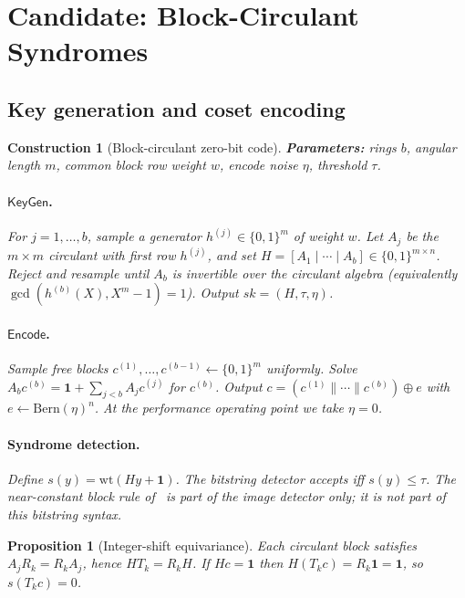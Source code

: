 \documentclass[11pt,a4paper]{article}
\newtheorem{proposition}[theorem]{Proposition}
\newtheorem{construction}[theorem]{Construction}
\newcommand{\Enc}{\mathsf{Encode}}
\newcommand{\KeyGen}{\mathsf{KeyGen}}
\newcommand{\wt}{\mathrm{wt}}
\newcommand{\Bern}{\mathrm{Bern}}
\newcommand{\sk}{\mathit{sk}}
\begin{document}
\section{Candidate: Block-Circulant Syndromes}
\label{sec:method}

\subsection{Key generation and coset encoding}
\label{sec:code}

\begin{construction}[Block-circulant zero-bit code]
\label{cons:block}
\textbf{Parameters:} rings \(b\), angular length \(m\), common block row weight \(w\),
encode noise \(\eta\), threshold \(\tau\).

\paragraph{$\KeyGen$.}
For \(j=1,\ldots,b\), sample a generator \(h^{(j)}\in\{0,1\}^m\) of weight \(w\).
Let \(A_j\) be the \(m\times m\) circulant with first row \(h^{(j)}\), and set
\(H=[A_1\mid\cdots\mid A_b]\in\{0,1\}^{m\times n}\).
Reject and resample until \(A_b\) is invertible over the circulant algebra
(equivalently \(\gcd(h^{(b)}(X),X^m-1)=1\)).
Output \(\sk=(H,\tau,\eta)\).

\paragraph{$\Enc$.}
Sample free blocks \(c^{(1)},\ldots,c^{(b-1)}\leftarrow\{0,1\}^m\) uniformly.
Solve \(A_b c^{(b)}=\mathbf{1}+\sum_{j<b}A_j c^{(j)}\) for \(c^{(b)}\).
Output \(c=(c^{(1)}\|\cdots\|c^{(b)})\oplus e\) with \(e\leftarrow\Bern(\eta)^n\).
At the performance operating point we take \(\eta=0\).

\paragraph{Syndrome detection.}
Define \(s(y)=\wt(Hy+\mathbf{1})\).
The bitstring detector accepts iff \(s(y)\le\tau\).
The near-constant block rule of~ is part of the image detector
only; it is not part of this bitstring syntax.
\end{construction}

\begin{proposition}[Integer-shift equivariance]
\label{prop:inv}
Each circulant block satisfies \(A_j R_k=R_k A_j\), hence \(HT_k=R_kH\).
If \(Hc=\mathbf{1}\) then \(H(T_kc)=R_k\mathbf{1}=\mathbf{1}\), so
\(s(T_kc)=0\).
\end{proposition}
\end{document}
